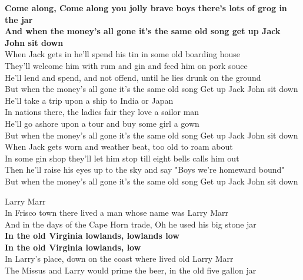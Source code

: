 \documentclass[letterpaper,9pt]{article}
\begin{document}
\large
\textbf{Come along, Come along you jolly brave boys there’s lots of grog in the jar \\
And when the money's all gone it's the same old song get up Jack John sit down} \\

\Large
When Jack gets in he'll spend his tin in some old boarding house \\
They'll welcome him with rum and gin and feed him on pork souce \\
He'll lend and spend, and not offend, until he lies drunk on the ground \\
But when the money's all gone it's the same old song Get up Jack John sit down \\

He'll take a trip upon a ship to India or Japan \\
In nations there, the ladies fair they love a sailor man \\
He'll go ashore upon a tour and buy some girl a gown \\
But when the money's all gone it's the same old song Get up Jack John sit down \\

When Jack gets worn and weather beat, too old to roam about \\
In some gin shop they'll let him stop till eight bells calls him out \\
Then he'll raise his eyes up to the sky and say "Boys we're homeward bound" \\
But when the money's all gone it's the same old song Get up Jack John sit down \\

\newpage
{}
\Huge
Larry Marr\\

\LARGE
In Frisco town there lived a man whose name was Larry Marr \\
And in the days of the Cape Horn trade, Oh he used his big stone jar \\

\textbf{In the old Virginia lowlands, lowlands low \\
In the old Virginia lowlands, low} \\

In Larry's place, down on the coast where lived old Larry Marr \\
The Missus and Larry would prime the beer, in the old five gallon jar \\
\end{document}
